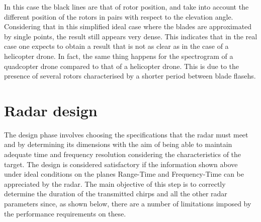 In this case the black lines are that of rotor position, and take into account the different position of the rotors in pairs with respect to the elevation angle.
Considering that in this simplified ideal case where the blades are approximated by single points, the result still appears very dense. This indicates that in the real case one expects to obtain a result that is not as clear as in the case of a helicopter drone. In fact, the same thing happens for the spectrogram of a quadcopter drone compared to that of a helicopter drone. This is due to the presence of several rotors characterised by a shorter period between blade flasehs.



\section{Radar design}
The design phase involves choosing the specifications that the radar must meet and by determining its dimensions with the aim of being able to maintain adequate time and frequency resolution considering the characteristics of the target. The design is considered satisfactory if the information shown above under ideal conditions on the planes Range-Time and Frequency-Time can be appreciated by the radar. The main objective of this step is to correctly determine the duration of the transmitted chirps and all the other radar parameters since, as shown below, there are a number of limitations imposed by the performance requirements on these. 


